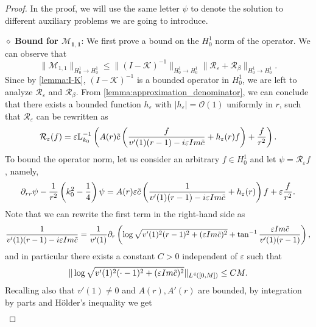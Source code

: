 \documentclass[11pt,reqno]{amsproc}
\def\eps{\varepsilon}
\def\de{{\partial}}
\def\Im{{\rm Im}}
\newcommand{\taninv}{\tan^{-1}}
\newcommand{\rmL}{\mathrm{L}}
\newcommand{\cM}{\mathcal{M}}
\theoremstyle{definition}
\theoremstyle{definition}
\numberwithin{equation}{section}
\begin{document}
\begin{proof}
In the proof, we will use the same letter $\psi$ to denote the solution to different auxiliary problems we are going to introduce.

\medskip
\noindent $\diamond$
\textbf{Bound for $\mathbf{\cM_{1,1}}$}: We first prove a bound on the $H^1_0$ norm of the operator. We can observe that
\begin{equation}
\label{eq:M_decomposition}
   \| \cM_{1,1}\|_{H^1_0\rightarrow H^1_0} \leq  \| (I-\mathcal K)^{-1}\|_{H^1_0\to H^1_0} \| \mathcal R_\varepsilon + \mathcal R_\beta \|_{H^1_0\to H^1_0}.
\end{equation}
Since by \cref{lemma:I-K}, $(I-\mathcal K)^{-1}$ is a bounded operator in $H^1_0$, we are left to analyze $\mathcal R_\varepsilon$ and $\mathcal R_\beta$. From \cref{lemma:approximation_denominator}, we can conclude that there exists a bounded function $h_\eps$ with $|h_\eps| = \mathcal{O}(1)$ uniformly in $r$,  such that $\mathcal R_\varepsilon$ can be rewritten as 
\begin{equation}
    \mathcal R_\varepsilon (f) = \varepsilon \rmL_{k_0}^{-1} \left(A(r) \tilde{c} \left(\frac{f}{v'(1)(r-1)- i \eps  \Im \tilde{c}} + h_\eps(r)f\right)+ \frac{f}{r^2}\right).
\end{equation}
To bound the operator norm, let us consider an arbitrary $f \in H^1_0$ and let $\psi = \mathcal R_\varepsilon f$, namely,
\begin{equation}
\label{eq:reps_eqn}
\partial_{rr}\psi - \frac{1}{r^2} \left(k_0^2-\frac{1}{4}\right) \psi = A(r) \eps \tilde{c} \left(\frac{1}{v'(1)(r-1)-i \eps \Im \tilde{c}} + h_\eps(r) \right) f + \varepsilon \frac{f}{r^2}.
\end{equation}
Note that we can rewrite the first term in the right-hand side as
\begin{align}
\label{eq:log_rewriting}
    \frac{1}{v'(1)(r-1)-i \eps \Im \tilde{c}} = \frac{1}{v'(1)} \de_r \left(\log\sqrt{v'(1)^2(r-1)^2 + (\varepsilon \Im\tilde{c})^2} + \taninv\frac{\varepsilon \Im \tilde{c}}{v'(1)(r-1)}\right),
\end{align}
and in particular there exists a constant $C>0$ independent of $\eps$ such that 
\begin{equation}
\|\log\sqrt{v'(1)^2(\cdot-1)^2 + (\varepsilon \Im\tilde{c})^2} \|_{L^4([0,M])}\leq C M.
\end{equation}
Recalling also that $v'(1) \neq 0$ and $A(r),A'(r)$ are bounded, by integration by parts and H\"older's inequality we get 
\begin{align}

\end{align}
\end{proof}
\end{document}

